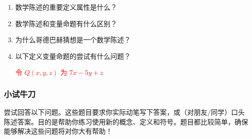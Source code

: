 \begin{enumerate}[label=(\arabic*)]
    \item 数学陈述的重要定义属性是什么？
    \item 数学陈述和变量命题有什么区别？
    \item 为什么哥德巴赫猜想是一个数学陈述？
    \item 以下定义变量命题的尝试有什么问题？
        \begin{center}
            \textcolor{red}{令 $Q(x, y, z)$ 为 $7x - 5y + z$}
        \end{center}
\end{enumerate}

\subsubsection*{小试牛刀}

尝试回答以下问题。这些题目要求你实际动笔写下答案，或（对朋友/同学）口头陈述答案。目的是帮助你练习使用新的概念、定义和符号。题目都比较简单，确保能够解决这些问题将对你大有帮助！

